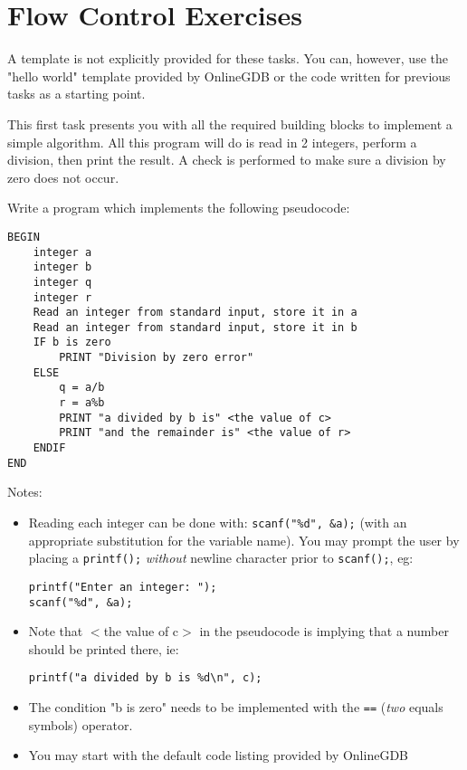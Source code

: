 \documentclass{lab}
\begin{document}
\pagebreak
\section{Flow Control Exercises}

A template is not explicitly provided for these tasks. You can, however, use the "hello world" template provided by OnlineGDB or the code written for previous tasks as a starting point.

This first task presents you with all the required building blocks to implement a simple algorithm. All this program will do is read in 2 integers, perform a division, then print the result. A check is performed to make sure a division by zero does not occur.

\begin{task}{}{}
Write a program which implements the following pseudocode:

\begin{lstlisting}[style=pseudo]
BEGIN 
	integer a 
	integer b
	integer q
	integer r
	Read an integer from standard input, store it in a
	Read an integer from standard input, store it in b
	IF b is zero
		PRINT "Division by zero error"
	ELSE
		q = a/b
		r = a%b
		PRINT "a divided by b is" <the value of c>
		PRINT "and the remainder is" <the value of r>
	ENDIF
END
\end{lstlisting}

Notes:

\begin{itemize}
\item Reading each integer can be done with: \texttt{scanf("\%d", \&a);} (with an appropriate substitution for the variable name). You may prompt the user by placing a \texttt{printf();} \textit{without} newline character prior to \texttt{scanf();}, eg:

\begin{lstlisting}[style=CStyle]
printf("Enter an integer: ");
scanf("%d", &a);
\end{lstlisting}

\item Note that $<$the value of c$>$ in the pseudocode is implying that a number should be printed there, ie:

\begin{lstlisting}[style=CStyle]
printf("a divided by b is %d\n", c);
\end{lstlisting}

\item The condition "b is zero" needs to be implemented with the \texttt{==} (\textit{two} equals symbols) operator.

\item You may start with the default code listing provided by OnlineGDB
\end{itemize}
\end{task}
\end{document}
